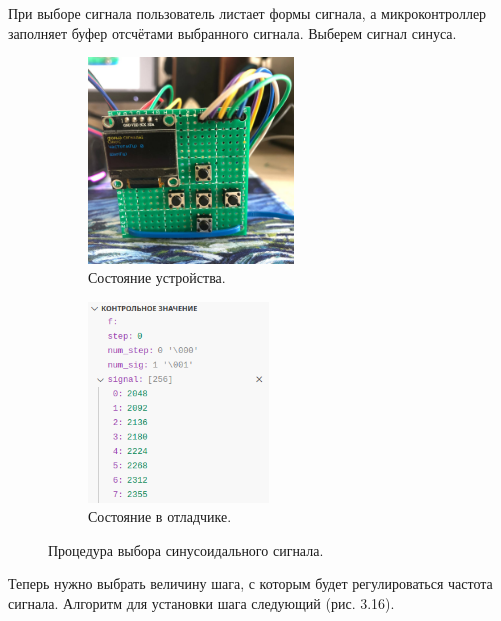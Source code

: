	При выборе сигнала пользователь листает формы сигнала, а микроконтроллер заполняет буфер отсчётами выбранного сигнала. Выберем сигнал синуса.
	\begin{figure}[H]\captionsetup[subfigure]{font=normalsize}
     \begin{subfigure}[H]{0.5\textwidth}
         \centering
         \includegraphics[width=0.6\textwidth]{../image/test1_u_s.jpg}
         \caption{Состояние устройства.}
     \end{subfigure}
     \hfill
     \begin{subfigure}[H]{0.5\textwidth}
         \centering
         \includegraphics[width=0.525\textwidth]{../image/test1_o_s.png}
         \caption{Состояние в отладчике.}
     \end{subfigure}
        \caption{Процедура выбора синусоидального сигнала.}
	\end{figure}

	Теперь нужно выбрать величину шага, с которым будет регулироваться частота сигнала. Алгоритм для установки шага следующий (рис. 3.16).
	
